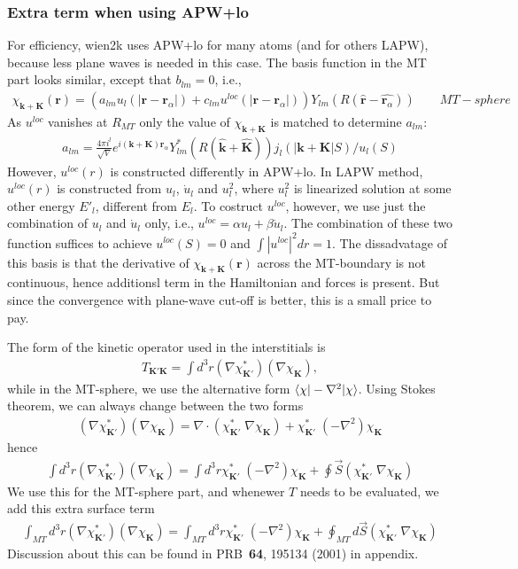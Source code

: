 \documentclass[aps,prb,floatfix,epsfig,singlecolumn,showpacs,preprintnumbers]{revtex4}
\renewcommand{\vr}{{\mathbf{r}}}
\newcommand{\vk}{{\mathbf{k}}}
\newcommand{\vK}{{\mathbf{K}}}
\begin{document}
\subsubsection{Extra term when using APW+lo}
\label{APWlo}

For efficiency, wien2k uses APW+lo for many atoms (and for others LAPW),
because less plane waves is needed in this case.
The basis function in the  MT part looks similar, except that
$b_{lm}=0$, i.e.,
\begin{eqnarray}
\chi_{\vk+\vK}(\vr) = \left( a_{lm} u_l(|\vr-\vr_\alpha|) + c_{lm} u^{loc}(|\vr-\vr_\alpha|)\right)
  Y_{lm}(R(\hat{\vr}-\hat{\vr_\alpha}))\qquad MT-sphere
\label{eq:bMT2}
\end{eqnarray}
As $u^{loc}$ vanishes at $R_{MT}$ only the value of $\chi_{\vk+\vK}$ is
matched to determine $a_{lm}$:
\begin{eqnarray}
a_{lm}=
\frac{4\pi i^l}{\sqrt{V}}e^{i(\vk+\vK)\vr_\alpha}Y_{lm}^*(R(\hat{\vk}+\hat{\vK}))
j_l(|\vk+\vK|S)/u_l(S) 
\end{eqnarray}
%
However, $u^{loc}(r)$ is constructed differently in APW+lo. In LAPW method, 
$u^{loc}(r)$ is constructed from $u_l$, $\dot{u}_l$ and $u_l^2$,
where $u_l^2$ is linearized solution at some other energy $E'_l$, different
from $E_l$.  To costruct $u^{loc}$, however, we use just the
combination of $u_l$ and $\dot{u}_l$ only, i.e., $u^{loc}=\alpha u_l + \beta
\dot{u}_l$. The combination of these two function suffices 
to achieve
$u^{loc}(S)=0$ and $\int |u^{loc}|^2 dr=1$.
The dissadvatage of this basis is that the derivative of
$\chi_{\vk+\vK}(\vr)$ across the MT-boundary is not continuous, hence
additionsl term in the Hamiltonian and forces is present. But since
the convergence with plane-wave cut-off is better, this is a small
price to pay.



The form of the kinetic operator used in the interstitials is 
\begin{eqnarray}
T_{\vK'\vK}=\int d^3r (\nabla\chi^*_{\vK'})(\nabla\chi_\vK),
\end{eqnarray}
while in the MT-sphere, we use the alternative form
$\braket{\chi|-\nabla^2|\chi}$. Using Stokes theorem, we can always
change between the two forms
\begin{eqnarray}
 (\nabla\chi^*_{\vK'})(\nabla\chi_\vK)=  \nabla\cdot\left(\chi^*_{\vK'}\;\nabla\chi_\vK\right)
+\chi^*_{\vK'}\;(-\nabla^2)\chi_\vK
\end{eqnarray}
hence
\begin{eqnarray}
\int d^3r (\nabla\chi^*_{\vK'})(\nabla\chi_\vK)=  
\int d^3 r \chi^*_{\vK'}\;(-\nabla^2)\chi_\vK +
\oint \vec{S} \left(\chi^*_{\vK'}\;\nabla\chi_\vK\right)
\end{eqnarray}
We use this for the MT-sphere part, and whenewer $T$ needs to be
evaluated, we add this extra surface term
\begin{eqnarray}
\int_{MT} d^3r (\nabla\chi^*_{\vK'})(\nabla\chi_\vK)=  
\int_{MT} d^3 r \chi^*_{\vK'}\;(-\nabla^2)\chi_\vK +
\oint_{MT} d\vec{S} \left(\chi^*_{\vK'}\;\nabla\chi_\vK\right)
\end{eqnarray}
Discussion about this can be found in PRB~\textbf{64}, 195134 (2001) in appendix.
\end{document}
